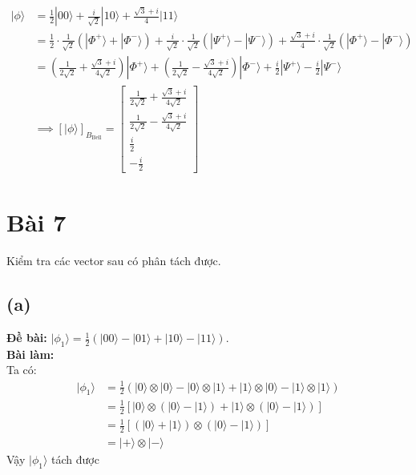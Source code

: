 \begin{align*}
    |\phi\rangle & = \frac{1}{2}|00\rangle + \frac{i}{\sqrt{2}}|10\rangle + \frac{\sqrt{3}+i}{4}|11\rangle                                                                                                                                                       \\
                 & = \frac{1}{2}\cdot\frac{1}{\sqrt{2}}(|\Phi^{+}\rangle + |\Phi^{-}\rangle) + \frac{i}{\sqrt{2}}\cdot\frac{1}{\sqrt{2}}(|\Psi^{+}\rangle - |\Psi^{-}\rangle) + \frac{\sqrt{3}+i}{4}\cdot\frac{1}{\sqrt{2}}(|\Phi^{+}\rangle - |\Phi^{-}\rangle) \\
                 & = \left(\frac{1}{2\sqrt{2}} + \frac{\sqrt{3}+i}{4\sqrt{2}}\right)|\Phi^{+}\rangle + \left(\frac{1}{2\sqrt{2}} - \frac{\sqrt{3}+i}{4\sqrt{2}}\right)|\Phi^{-}\rangle + \frac{i}{2}|\Psi^{+}\rangle - \frac{i}{2}|\Psi^{-}\rangle               \\
                 & \implies
    [|\phi\rangle]_{B_{\mathrm{Bell}}} = \begin{bmatrix}
                                             \frac{1}{2\sqrt{2}} + \frac{\sqrt{3}+i}{4\sqrt{2}} \\
                                             \frac{1}{2\sqrt{2}} - \frac{\sqrt{3}+i}{4\sqrt{2}} \\
                                             \frac{i}{2}                                        \\
                                             -\frac{i}{2}
                                         \end{bmatrix}
\end{align*}

\section{Bài 7}
Kiểm tra các vector sau có phân tách được.

\subsection{(a)}
\textbf{Đề bài:} $|\phi_{1}\rangle=\frac{1}{2}(|00\rangle-|01\rangle+|10\rangle-|11\rangle).$\\
\textbf{Bài làm:}\\
Ta có:
\begin{align*}
    |\phi_{1}\rangle & = \frac{1}{2}(|0\rangle \otimes |0\rangle - |0\rangle \otimes |1\rangle + |1\rangle \otimes |0\rangle - |1\rangle \otimes |1\rangle) \\
                     & = \frac{1}{2}[|0\rangle \otimes (|0\rangle - |1\rangle) + |1\rangle \otimes (|0\rangle - |1\rangle)]                                 \\
                     & = \frac{1}{2}[(|0\rangle + |1\rangle) \otimes (|0\rangle - |1\rangle)]                                                               \\
                     & = |+\rangle \otimes |-\rangle
\end{align*}
Vậy $|\phi_{1}\rangle$ tách được

